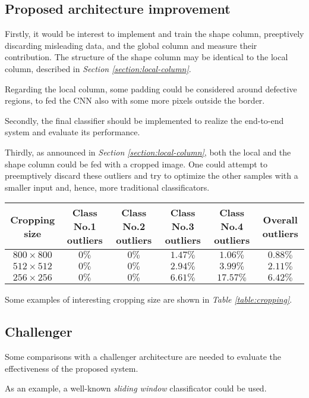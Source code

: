     \subsection{Proposed architecture improvement}
    \par{
        Firstly, it would be interest to implement and train the shape column, preeptively discarding misleading data, and the global column and measure their contribution. The structure of the shape column may be identical to the local column, described in \emph{Section \ref{section:local-column}}.
    }
    \par{
        Regarding the local column, some padding could be considered around defective regions, to fed the CNN also with some more pixels outside the border.
    }
    \par{
        Secondly, the final classifier should be implemented to realize the end-to-end system and evaluate its performance.
    }
    \par{
        Thirdly, as announced in \emph{Section \ref{section:local-column}}, both the local and the shape column could be fed with a cropped image. One could attempt to preemptively discard these outliers and try to optimize the other samples with a smaller input and, hence, more traditional classificators.
    }
    \begin{table*}
        \centering
        \normalsize
        \begin{tabular}{|c|c|c|c|c|c|}
            \hline
            \textbf{Cropping size} & \textbf{Class No.1 outliers} & \textbf{Class No.2 outliers}& \textbf{Class No.3 outliers} & \textbf{Class No.4 outliers} & \textbf{Overall outliers}\\\hline
            $800\times 800$ & $0\%$ & $0\%$ & $1.47\%$ & $1.06\%$ & $0.88\%$\\
            $512\times 512$ & $0\%$ & $0\%$ & $2.94\%$ & $3.99\%$ & $2.11\%$\\
            $256\times 256$ & $0\%$ & $0\%$ & $6.61\%$ & $17.57\%$& $6.42\%$\\
            \hline
        \end{tabular}
        \vspace{0.5cm}
        \caption{Cropping examples.}\label{table:cropping}
    \end{table*}
    \par{
        Some examples of interesting cropping size are shown in \emph{Table \ref{table:cropping}}.
    }
    \subsection{Challenger}
    \par{
        Some comparisons with a challenger architecture are needed to evaluate the effectiveness of the proposed system.
    }
    \par{
        As an example, a well-known \emph{sliding window} classificator could be used.
    }
